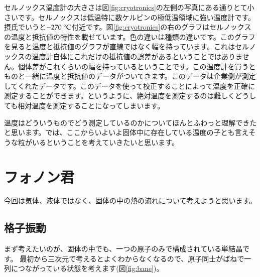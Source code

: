 \documentclass[10pt,b5paper,papersize,dvipdfmx]{jsbook}
\begin{document}
セルノックス温度計の大きさは図\ref{fig:cryotronics}の左側の写真にある通りとて小さいです。セルノックスは低温特に数ケルビンの極低温領域に強い温度計です。摂氏でいうと$-270\ ^\circ \rm{C}$付近です。図\ref{fig:cryotronics}の右のグラフはセルノックスの温度と抵抗値の特性を載せています。色の違いは種類の違いです。このグラフを見ると温度と抵抗値のグラフが直線ではなく幅を持っています。これはセルノックスの温度計自体にこれだけの抵抗値の誤差があるということではありません。個体差がこれくらいの幅を持っているということです。この温度計を買うとものと一緒に温度と抵抗値のデータがついてきます。このデータは企業側が測定してくれたデータです。このデータを使って校正することによって温度を正確に測定することができます。というように、絶対温度を測定するのは難しくどうしても相対温度を測定することになってしまいます。\par
温度はどういうものでどう測定しているのかについてほんとふわっと理解できたと思います。では、ここからいよいよ固体中に存在している温度の子とも言えそうな粒がいるということを考えていきたいと思います。

\section{フォノン君}
今回は気体、液体ではなく、固体の中の熱の流れについて考えようと思います。
\subsection{格子振動}
まず考えたいのが、固体の中でも、一つの原子のみで構成されている単結晶です。
最初から三次元で考えるとよくわからなくなるので、原子同士がばねで一列につながっている状態を考えます(図\ref{fig:bane})。\par
\end{document}
